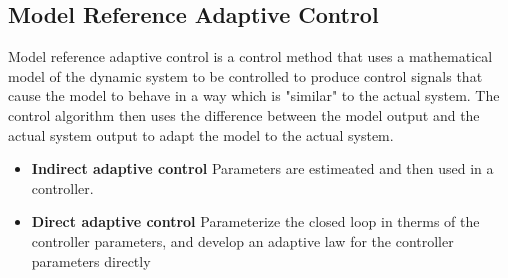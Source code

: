 \documentclass[10pt]{article}
\begin{document}
\begin{multicols*}{2}
\section{Model Reference Adaptive Control}
Model reference adaptive control is a control method that uses a mathematical model of the dynamic system to be controlled to produce control signals that cause the model to behave in a way which is "similar" to the actual system. The control algorithm then uses the difference between the model output and the actual system output to adapt the model to the actual system.
\begin{itemize}
	\item \textbf{Indirect adaptive control} Parameters are estimeated and then used in a controller.
	\item \textbf{Direct adaptive control} Parameterize the closed loop in therms of the controller parameters, and develop an adaptive law for the controller parameters directly
\end{itemize}

\end{multicols*}
\end{document}
